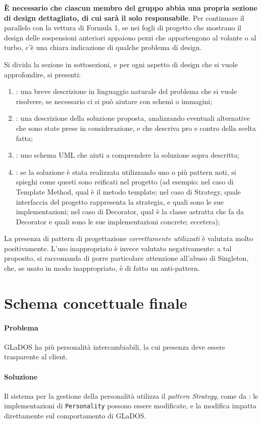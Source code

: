 \documentclass[a4paper,12pt]{report}
\begin{document}
\textbf{È necessario che ciascun membro del gruppo abbia una propria sezione di design dettagliato,
di cui sarà il solo responsabile}.
Per continuare il parallelo con la vettura di Formula 1, se nei fogli di progetto che mostrano il
design delle sospensioni anteriori appaiono pezzi che appartengono al volante o al turbo, c'è una
chiara indicazione di qualche problema di design.

Si divida la sezione in sottosezioni, e per ogni aspetto di design che si vuole approfondire, si presenti:
\begin{enumerate}
    \item: una breve descrizione in linguaggio naturale del problema che si vuole risolvere, se necessario ci si può aiutare con schemi o immagini;
    \item: una descrizione della soluzione proposta, analizzando eventuali alternative che sono state prese in considerazione, e che descriva pro e contro della scelta fatta;
    \item: uno schema UML che aiuti a comprendere la soluzione sopra descritta;
    \item: se la soluzione è stata realizzata utilizzando uno o più pattern noti, si spieghi come questi sono reificati nel progetto
    (ad esempio: nel caso di Template Method, qual è il metodo template;
    nel caso di Strategy, quale interfaccia del progetto rappresenta la strategia, e quali sono le sue implementazioni;
    nel caso di Decorator, qual è la classe astratta che fa da Decorator e quali sono le sue implementazioni concrete; eccetera);
\end{enumerate}
%
La presenza di pattern di progettazione \emph{correttamente utilizzati} è valutata molto positivamente.
%
L'uso inappropriato è invece valutato negativamente: a tal proposito, si raccomanda di porre particolare attenzione all'abuso di Singleton, che, se usato in modo inappropriato, è di fatto un anti-pattern.

\section{Schema concettuale finale}

\paragraph{Problema} GLaDOS ha più personalità intercambiabili, la cui presenza deve essere trasparente al client.

\paragraph{Soluzione} Il sistema per la gestione della personalità utilizza il \textit{pattern Strategy}, come da
: le implementazioni di \texttt{Personality} possono essere modificate, e la
modifica impatta direttamente sul comportamento di GLaDOS.
\end{document}
